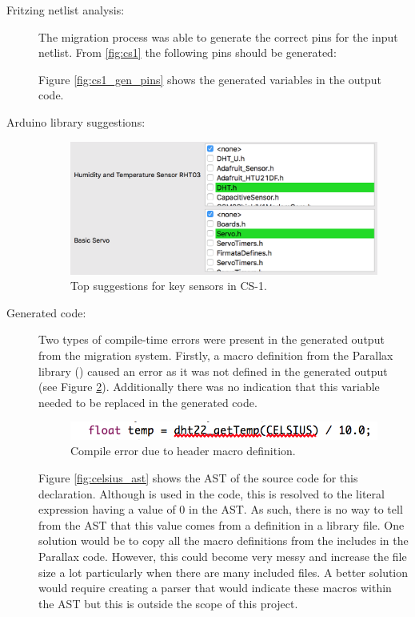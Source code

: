 \documentclass{UoYCSproject}
\begin{document}
\begin{description}
\item[Fritzing netlist analysis:] 
The migration process was able to generate the correct pins for the input netlist. From \ref{fig:cs1} the following pins should be generated:

Figure \ref{fig:cs1_gen_pins} shows the generated variables in the output code.  

\item[Arduino library suggestions:]
\begin{figure}[h!]
  \centering
  \includegraphics[width=0.7\linewidth]{graphics/selection_options.png}
  \caption{Top suggestions for key sensors in CS-1.}
  \label{fig:selection_options}
\end{figure}
\item[Generated code:]
Two types of compile-time errors were present in the generated output from the migration system. Firstly, a macro definition from the Parallax  library () caused an error as it was not defined in the generated output (see Figure \ref{fig:celsius_error}). Additionally there was no indication that this variable needed to be replaced in the generated code.
\begin{figure}[h!]
  \centering
  \includegraphics[width=0.7\linewidth]{graphics/celsius_error.png}
  \caption{Compile error due to header macro definition.}
  \label{fig:celsius_error}
\end{figure}

Figure \ref{fig:celsius_ast} shows the AST of the source code for this declaration. Although  is used in the code, this is resolved to the literal expression having a value of 0 in the AST. As such, there is no way to tell from the AST that this value comes from a definition in a library file. One solution would be to copy all the macro definitions from the includes in the Parallax code. However, this could become very messy and increase the file size a lot particularly when there are many included files. A better solution would require creating a parser that would indicate these macros within the AST but this is outside the scope of this project.


\end{description}
\end{document}
